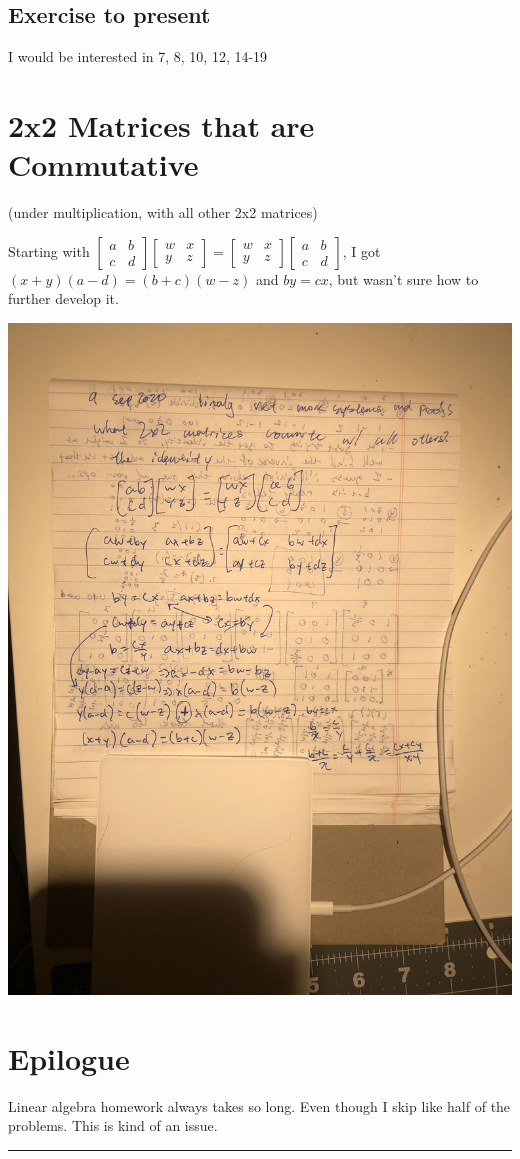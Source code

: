 \documentclass[letterpaper]{article}
\begin{document}
\subsection{Exercise to present}
\label{sec:org27e3894}
I would be interested in 7, 8, 10, 12, 14-19

\section{2x2 Matrices that are Commutative}
\label{sec:org72e432a}
(under multiplication, with all other 2x2 matrices)

Starting with
\(\begin{bmatrix}a&b\\c&d\end{bmatrix}\begin{bmatrix}w&x\\y&z\end{bmatrix}=\begin{bmatrix}w&x\\y&z\end{bmatrix}\begin{bmatrix}a&b\\c&d\end{bmatrix}\),
I got \((x+y)(a-d) = (b+c)(w-z)\) and \(by=cx\), but wasn't sure how to
further develop it.

\begin{center}
\includegraphics[width=.9\linewidth]{IMG_1380.jpg}
\end{center}

\section{Epilogue}
\label{sec:orgbe5d3d5}
Linear algebra homework always takes so long. Even though I skip like
half of the problems. This is kind of an issue.

\noindent\rule{\textwidth}{0.5pt}
\end{document}

